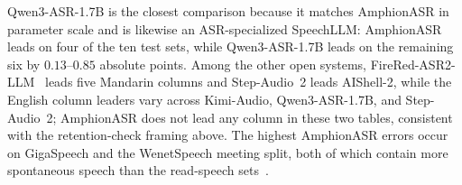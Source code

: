 



Qwen3-ASR-1.7B is the closest comparison because it matches AmphionASR
in parameter scale and is likewise an ASR-specialized SpeechLLM:
AmphionASR leads on four of the ten test sets, while Qwen3-ASR-1.7B
leads on the remaining six by $0.13$--$0.85$ absolute points.
Among the other open systems, FireRed-ASR2-LLM~\cite{fireredasr2025}
leads five Mandarin columns and Step-Audio~2 leads AIShell-2, while the
English column leaders vary across Kimi-Audio, Qwen3-ASR-1.7B, and
Step-Audio~2; AmphionASR does not lead any column in these two tables,
consistent with the retention-check framing above.
The highest AmphionASR errors occur on GigaSpeech and the WenetSpeech
meeting split, both of which contain more spontaneous speech than the
read-speech sets~\cite{chen2021gigaspeech}.
